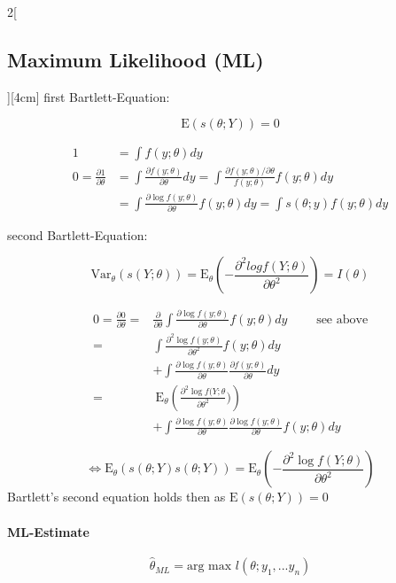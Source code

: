 \documentclass[8pt]{extarticle}
\begin{document}
\begin{multicols}{2}[\subsection{Maximum Likelihood (ML)}][4cm]
  first Bartlett-Equation:
  
  $$\mathrm{E}\left(s(\theta;Y)\right) = 0$$
  
\begin{Proof}
\vspace{-1.5em}
\begin{align*}
1 &= \int f(y;\theta) dy \\
0 = \frac{\partial 1}{\partial\theta} &= \int \frac{\partial f(y;\theta)}{\partial \theta}dy = \int \frac{\partial f(y;\theta) / \partial\theta}{f(y;\theta)} f(y;\theta) dy \\ &= \int \frac{\partial \log f(y;\theta)}{\partial\theta}  f(y;\theta) dy = \int s(\theta;y) f(y;\theta) dy
\end{align*}
\end{Proof}
  
  second Bartlett-Equation:
  
  $$\mathrm{Var}_\theta\left(s(Y;\theta)\right) = \mathrm{E}_\theta\left(-\frac{\partial^2 log f(Y;\theta)}{\partial\theta^2}\right) = I(\theta)$$
  
\begin{Proof}
\vspace{-1.5em}
\begin{align*}
0 = \frac{\partial 0}{\partial \theta} =& \frac{\partial}{\partial\theta}\int \frac{\partial \log f(y;\theta)}{\partial\theta}  f(y;\theta) dy \hspace{2em}\text{      see above}\\
=& \int  \frac{\partial^2 \log f(y;\theta)}{\partial \theta^2}  f(y;\theta) dy  \\
&+ \int\frac{\partial \log f(y;\theta)}{\partial \theta}\frac{\partial f(y;\theta)}{\partial \theta}dy \\
=& \: \mathrm{E}_\theta \left( \frac{\partial^2 \log f(Y;\theta}{\partial \theta^2} )\right)  \\
&+ \int\frac{\partial \log f(y;\theta)}{\partial \theta}\frac{\partial \log f(y;\theta)}{\partial \theta} f(y;\theta) dy 
\end{align*}

$$\Leftrightarrow \mathrm{E}_\theta \left(s(\theta;Y) s(\theta;Y)\right) = \mathrm{E}_\theta \left(- \frac{\partial^2 \log f(Y;\theta)}{\partial \theta^2} \right)$$
\noindent Bartlett's second equation holds then as $\mathrm{E}\left(s(\theta;Y)\right) = 0$
\end{Proof}
  
  \paragraph{ML-Estimate}
   $$\hat{\theta}_{ML} = \text{arg max } l(\theta; y_1,...y_n)$$
   

\end{multicols}
\end{document}
